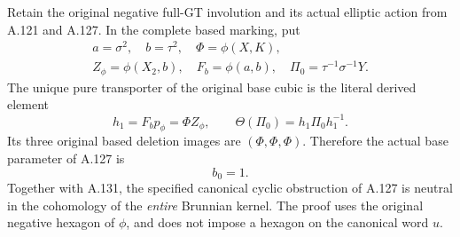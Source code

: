 Retain the original negative full-GT involution and its actual elliptic
action from A.121 and A.127. In the complete based marking, put
\[
\begin{gathered}
 a=\sigma^2,\quad b=\tau^2,\quad \Phi=\phi(X,K),\\
 Z_\phi=\phi(X_2,b),\quad F_b=\phi(a,b),\quad
 \Pi_0=\tau^{-1}\sigma^{-1}Y.
\end{gathered}
\]
The unique pure transporter of the original base cubic is the literal
derived element
\[
 h_1=F_b p_\phi=\Phi Z_\phi,\qquad
 \Theta(\Pi_0)=h_1\Pi_0h_1^{-1}.
 \tag{A.132.1}
\]
Its three original based deletion images are
\((\Phi,\Phi,\Phi)\). Therefore the actual base parameter of
A.127 is
\[
                         b_0=1.                    \tag{A.132.2}
\]
Together with A.131, the specified canonical cyclic obstruction of
A.127 is neutral in the cohomology of the \emph{entire} Brunnian
kernel. The proof uses the original negative hexagon of \(\phi\),
and does not impose a hexagon on the canonical word \(u\).

